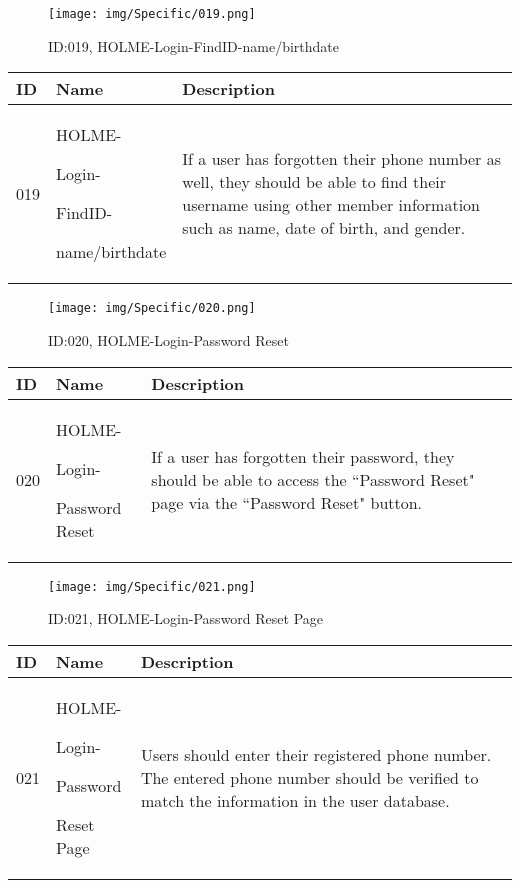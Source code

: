 \documentclass[conference]{IEEEtran}
\begin{document}
\begin{enumerate}
\begin{figure}[h]
\centering
\texttt{[image: img/Specific/019.png]}
\caption{ID:019, HOLME-Login-FindID-name/birthdate}
\end{figure}
\begin{table}[h]
\def\arraystretch{1.2} \small
    \begin{tabular}{|p{1cm}|p{1.8cm}|p{5.0cm}|}
        \hline
        ID & Name & Description\\ \hline
         019 \par  & HOLME-\par Login-\par FindID- \par name/birthdate &If a user has forgotten their phone number as well, they should be able to find their username using other member information such as name, date of birth, and gender.\\ \hline
    \end{tabular}
\end{table}

\begin{figure}[h]
\centering
\texttt{[image: img/Specific/020.png]}
\caption{ID:020, HOLME-Login-Password Reset}
\end{figure}
\begin{table}[h]
\def\arraystretch{1.2} \small
    \begin{tabular}{|p{1cm}|p{1.8cm}|p{5.0cm}|}
        \hline
        ID & Name & Description\\ \hline
         020 \par  & HOLME-\par Login-\par Password Reset &If a user has forgotten their password, they should be able to access the ``Password Reset" page via the ``Password Reset" button.\\ \hline
    \end{tabular}
\end{table}

\begin{figure}[h]
\centering
\texttt{[image: img/Specific/021.png]}
\caption{ID:021, HOLME-Login-Password Reset Page}
\end{figure}
\begin{table}[h]
\def\arraystretch{1.2} \small
    \begin{tabular}{|p{1cm}|p{1.8cm}|p{5.0cm}|}
        \hline
        ID & Name & Description\\ \hline
         021 \par  & HOLME-\par Login-\par Password \par Reset Page &Users should enter their registered phone number. The entered phone number should be verified to match the information in the user database.\\ \hline
    \end{tabular}
\end{table}
\clearpage


\end{enumerate}
\end{document}
